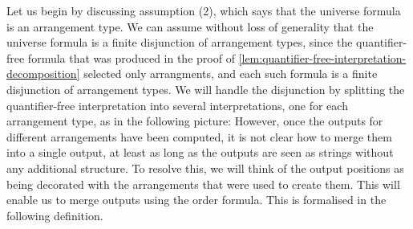 


Let us begin by discussing assumption (2), which says that the universe formula is an arrangement type. We can assume without loss of generality that the universe formula is a finite disjunction of arrangement types, since the quantifier-free formula that was produced in the proof of \cref{lem:quantifier-free-interpretation-decomposition} selected only arrangments, and each such formula is a finite disjunction of arrangement types.  We will  handle the disjunction by   splitting the quantifier-free interpretation into several interpretations, one for each arrangement type, as in the following 
picture:
However, once the outputs for different arrangements have been computed,  it is not clear how to  merge them into a single output, at least as long as the outputs are seen as strings without any additional structure. To resolve this, we will think of the output positions as being decorated with the arrangements that were used to create them. This will enable us to merge outputs using the order formula. This is formalised in the following definition.


